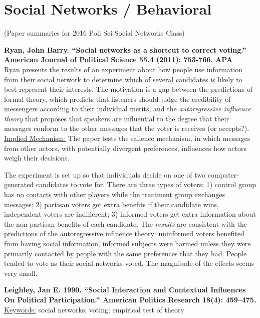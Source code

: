 \documentclass{article}[12pt]
\begin{document}
\section{Social Networks / Behavioral}
(Paper summaries for 2016 Poli Sci Social Networks Class)

\textbf{Ryan, John Barry. ``Social networks as a shortcut to correct voting.'' American Journal of Political Science 55.4 (2011): 753-766. APA}\\
Ryan presents the results of an experiment about how people use information from their social network to determine which of several candidates is likely to best represent their interests. The motivation is a gap between the predictions of formal theory, which predicts that listeners should judge the credibility of messengers according to their individual merits, and the \textit{autoregressive influence theory} that proposes that speakers are influential to the degree that their messages conform to the other messages that the voter is receives (or accepts?). \underline{Implied Mechanism:} The paper tests the salience mechanism, in which messages from other actors, with potentially divergent preferences, influences how actors weigh their decisions.

The experiment is set up so that individuals decide on one of two computer-generated candidates to vote for. There are three types of voters: 1) control group has no contacts with other players while the treatment group exchanges messages; 2) partisan voters get extra benefits if their candidate wins, independent voters are indifferent; 3) informed voters get extra information about the non-partisan benefits of each candidate. The \textit{results} are consistent with the predictions of the autoregressive influence theory: uninformed voters benefited from having social information, informed subjects were harmed unless they were primarily contacted by people with the same preferences that they had. People tended to vote as their social networks voted. The magnitude of the effects seems very small.

\textbf{Leighley, Jan E. 1990. “Social Interaction and Contextual Influences On Political Participation.” American Politics Research 18(4): 459–475.}\\

\underline{Keywords:} social networks; voting; empirical test of theory
\end{document}
